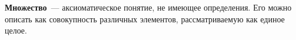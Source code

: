  \textbf{Множество}~--- аксиоматическое понятие, не имеющее определения.
Его можно описать как совокупность различных элементов, рассматриваемую как единое целое.
